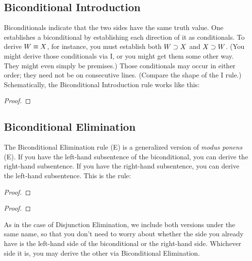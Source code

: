 \subsection{Biconditional Introduction}
Biconditionals indicate that the two sides have the same truth value. One establishes a biconditional by establishing each direction of it as conditionals. To derive $W \equiv X$, for instance, you must establish both $W \supset X$ and $X \supset W$. (You might derive those conditionals via {\eif}I, or you might get them some other way. They might even simply be premises.) Those conditionals may occur in either order; they need not be on consecutive lines. (Compare the shape of the {\eand}I rule.) Schematically, the Biconditional Introduction rule works like this:

\begin{proof}
	 
\end{proof}


\subsection{Biconditional Elimination}

The Biconditional Elimination rule ({\eiff}E) is a generalized version of \emph{modus ponens} ({\eif}E). If you have the left-hand subsentence of the biconditional, you can derive the right-hand subsentence. If you have the right-hand subsentence, you can derive the left-hand subsentence. This is the rule:



\begin{multicols}{2}
\begin{proof}
	\metaA{}
	\metaB{} 
\end{proof}
\begin{proof}
	\metaB{}
	\metaA{} 
\end{proof}
\end{multicols}

As in the case of Disjunction Elimination, we include both versions under the same name, so that you don't need to worry about whether the side you already have is the left-hand side of the biconditional or the right-hand side. Whichever side it is, you may derive the other via Biconditional Elimination.


